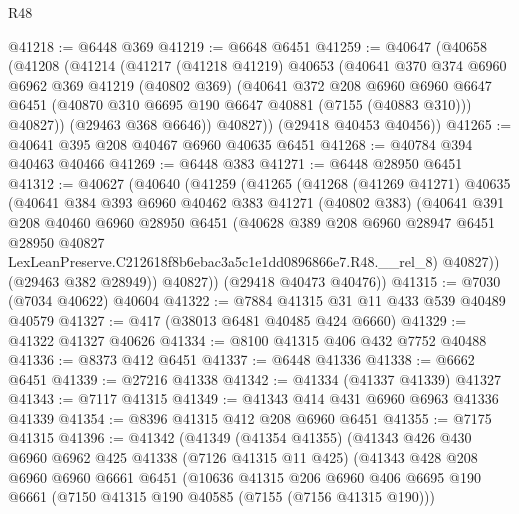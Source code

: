 \begin{lexlean}{R48}
\begin{coremodule}
@41218 := @6448 @369
@41219 := @6648 @6451
@41259 := @40647
    (@40658
      (@41208
        (@41214
          (@41217
            (@41218 @41219)
            @40653
            (@40641
              @370
              @374
              @6960
              @6962
              @369
              @41219
              (@40802 @369)
              (@40641
                @372
                @208
                @6960
                @6960
                @6647
                @6451
                (@40870 @310 @6695 @190 @6647 @40881 (@7155 (@40883 @310)))
                @40827))
            (@29463 @368 @6646))
          @40827))
      (@29418 @40453 @40456))
@41265 := @40641 @395 @208 @40467 @6960 @40635 @6451
@41268 := @40784 @394 @40463 @40466
@41269 := @6448 @383
@41271 := @6448 @28950 @6451
@41312 := @40627
    (@40640
      (@41259
        (@41265
          (@41268
            (@41269 @41271)
            @40635
            (@40641
              @384
              @393
              @6960
              @40462
              @383
              @41271
              (@40802 @383)
              (@40641
                @391
                @208
                @40460
                @6960
                @28950
                @6451
                (@40628
                  @389
                  @208
                  @6960
                  @28947
                  @6451
                  @28950
                  @40827
                  LexLeanPreserve.C212618f8b6ebac3a5c1e1dd0896866e7.R48.__rel_8)
                @40827))
            (@29463 @382 @28949))
          @40827))
      (@29418 @40473 @40476))
@41315 := @7030 (@7034 @40622) @40604
@41322 := @7884 @41315 @31 @11 @433 @539 @40489 @40579
@41327 := @417 (@38013 @6481 @40485 @424 @6660)
@41329 := @41322 @41327 @40626
@41334 := @8100 @41315 @406 @432 @7752 @40488
@41336 := @8373 @412 @6451
@41337 := @6448 @41336
@41338 := @6662 @6451
@41339 := @27216 @41338
@41342 := @41334 (@41337 @41339) @41327
@41343 := @7117 @41315
@41349 := @41343 @414 @431 @6960 @6963 @41336 @41339
@41354 := @8396 @41315 @412 @208 @6960 @6451
@41355 := @7175 @41315
@41396 := @41342
    (@41349
      (@41354 @41355)
      (@41343
        @426
        @430
        @6960
        @6962
        @425
        @41338
        (@7126 @41315 @11 @425)
        (@41343
          @428
          @208
          @6960
          @6960
          @6661
          @6451
          (@10636
            @41315
            @206
            @6960
            @406
            @6695
            @190
            @6661
            (@7150 @41315 @190 @40585 (@7155 (@7156 @41315 @190)))

\end{coremodule}
\end{lexlean}
